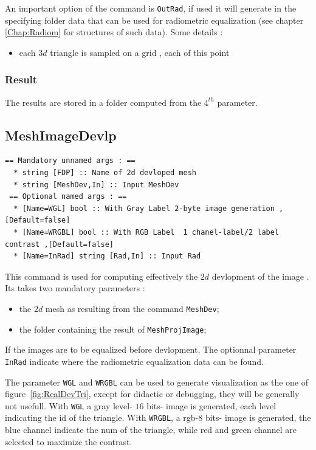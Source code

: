 An important option of the command is {\tt OutRad},  if used it will generate in
the specifying folder data that can be used for radiometric equalization (see
chapter \ref{Chap:Radiom} for structures of such data). Some details :

\begin{itemize}
    \item each $3d$ triangle is sampled on a grid , each of this point 

\end{itemize}



\subsubsection{Result}

The results are stored in a folder computed from the $4^{th}$ parameter.



\subsection{MeshImageDevlp}

\begin{verbatim}
== Mandatory unnamed args : ==
  * string [FDP] :: Name of 2d devloped mesh
  * string [MeshDev,In] :: Input MeshDev
 == Optional named args : ==
  * [Name=WGL] bool :: With Gray Label 2-byte image generation ,[Default=false]
  * [Name=WRGBL] bool :: With RGB Label  1 chanel-label/2 label contrast ,[Default=false]
  * [Name=InRad] string [Rad,In] :: Input Rad
\end{verbatim}

This command is used for computing effectively the $2d$ devlopment of the image . Its takes two mandatory
parameters :

\begin{itemize}
   \item the $2d$ mesh as resulting from the command {\tt MeshDev};
   \item the folder containing the result of {\tt MeshProjImage};
\end{itemize}

If the images are to be equalized before devlopment, The optionnal parameter {\tt InRad} 
indicate where the radiometric equalization data can be found.  

The parameter {\tt WGL} and {\tt WRGBL} can be used to generate visualization as the one
of figure~\ref{fig:RealDevTri}, except for didactic or debugging, they will be generally not usefull.
 With {\tt WGL} a gray level- $16$ bits- image is generated,
each level indicating the id of the triangle. With {\tt WRGBL}, a rgb-$8$ bits- image is generated, the 
blue channel indicate the num of the triangle, while red and green channel are selected to maximize
the contrast.



